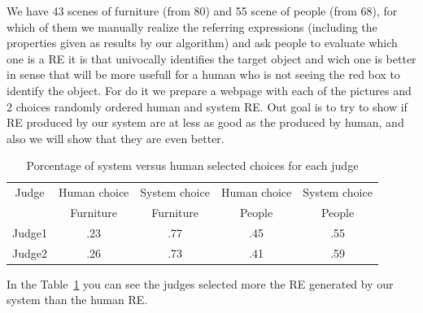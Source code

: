 We have 43 scenes of furniture (from 80) and 55 scene of people (from 68), for which of them we manually realize the referring expressions (including the properties given as results by our algorithm) and ask people to evaluate which one is a RE it is that univocally identifies the target object and wich one is better in sense that will be more usefull for a human who is not seeing the red box to identify the object. For do it we prepare a webpage with each of the pictures and 2 choices randomly ordered human and system RE. Out goal is to try to show if RE produced by our system are at less as good as the produced by human, and also we will show that they are even better.



\begin{table}[h!]
\begin{center}
\begin{tabular}{|c|c|c|c|c|}
\hline
Judge    & Human choice & System choice  & Human choice & System choice \\
	 &    Furniture &    Furniture   &    People    &    People \\
\hline 
Judge1   & .23       & .77      & .45  & .55  \\
Judge2   & .26       & .73      & .41  & .59  \\
\hline
\end{tabular}
\caption{Porcentage of system versus human selected choices for each judge} 
\label{system-versus-human}
\end{center}
\end{table}
In the Table~\ref{system-versus-human} you can see the judges selected more the RE generated by our system than the human RE.

